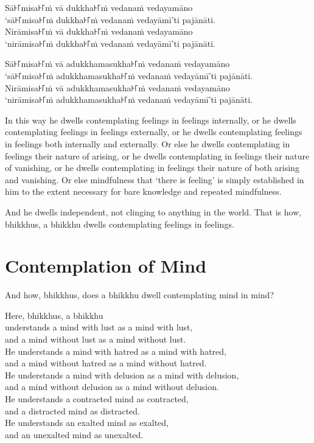 Sā꜔꜒misa꜔꜒ṁ vā dukkha꜔꜒ṁ vedanaṁ vedayamāno\\
‘sā꜔꜒misa꜔꜒ṁ dukkha꜔꜒ṁ vedanaṁ vedayāmī’ti pajānāti.\\
Nirāmisa꜔꜒ṁ vā dukkha꜔꜒ṁ vedanaṁ vedayamāno\\
‘nirāmisa꜔꜒ṁ dukkha꜔꜒ṁ vedanaṁ vedayāmī’ti pajānāti.

Sā꜔꜒misa꜔꜒ṁ vā adukkhamasukha꜔꜒ṁ vedanaṁ vedayamāno\\
‘sā꜔꜒misa꜔꜒ṁ adukkhamasukha꜔꜒ṁ vedanaṁ vedayāmī’ti pajānāti.\\
Nirāmisa꜔꜒ṁ vā adukkhamasukha꜔꜒ṁ vedanaṁ vedayamāno\\
‘nirāmisa꜔꜒ṁ adukkhamasukha꜔꜒ṁ vedanaṁ vedayāmī’ti pajānāti.

\englishPage

In this way he dwells contemplating feelings in feelings internally, or he
dwells contemplating feelings in feelings externally, or he dwells contemplating
feelings in feelings both internally and externally. Or else he dwells
contemplating in feelings their nature of arising, or he dwells contemplating in
feelings their nature of vanishing, or he dwells contemplating in feelings their
nature of both arising and vanishing. Or else mindfulness that ‘there is
feeling’ is simply established in him to the extent necessary for bare knowledge
and repeated mindfulness.

And he dwells independent, not clinging to anything in the world. That is how,
bhikkhus, a bhikkhu dwells contemplating feelings in feelings.


\chapter{Contemplation of Mind}

And how, bhikkhus, does a bhikkhu dwell contemplating mind in mind?

Here, bhikkhus, a bhikkhu\\
understands a mind with lust as a mind with lust,\\
and a mind without lust as a mind without lust.\\
He understands a mind with hatred as a mind with hatred,\\
and a mind without hatred as a mind without hatred.\\
He understands a mind with delusion as a mind with delusion,\\
and a mind without delusion as a mind without delusion.\\
He understands a contracted mind as contracted,\\
and a distracted mind as distracted.\\
He understands an exalted mind as exalted,\\
and an unexalted mind as unexalted.


